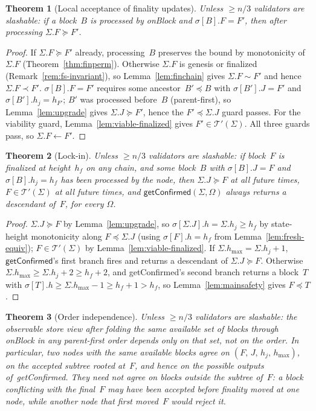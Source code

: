 \documentclass{article}
\newcommand{\hmax}{\ensuremath{h_{\max}}\xspace}
\newcommand{\viableTree}{\ensuremath{\mathcal{T}'}}
\newcommand{\onBlock}{\textsf{onBlock}\xspace}
\newcommand{\getConfirmed}{\textsf{getConfirmed}\xspace}
\theoremstyle{plain}
\newtheorem{theorem}{Theorem}
\theoremstyle{definition}
\theoremstyle{remark}
\begin{document}
\begin{theorem}[Local acceptance of finality updates]\label{thm:finlive}
Unless $\geq n/3$ validators are slashable: if a block~$B$ is processed by \onBlock and $\sigma[B].F = F'$, then after processing $\Sigma.F \succeq F'$.
\end{theorem}

\begin{proof}
If $\Sigma.F \succeq F'$ already, processing~$B$ preserves the bound by monotonicity of~$\Sigma.F$ (Theorem~\ref{thm:finperm}).
Otherwise $\Sigma.F$ is genesis or finalized (Remark~\ref{rem:fs-invariant}), so Lemma~\ref{lem:finchain} gives $\Sigma.F \sim F'$ and hence $\Sigma.F \prec F'$.
$\sigma[B].F = F'$ requires some ancestor~$B' \preceq B$ with $\sigma[B'].J = F'$ and $\sigma[B'].h_j = h_{F'}$; $B'$ was processed before~$B$ (parent-first), so Lemma~\ref{lem:upgrade} gives $\Sigma.J \succeq F'$, hence the $F' \preceq \Sigma.J$ guard passes.
For the viability guard, Lemma~\ref{lem:viable-finalized} gives $F' \in \viableTree(\Sigma)$.
All three guards pass, so $\Sigma.F \gets F'$.
\end{proof}

\begin{theorem}[Lock-in]\label{thm:lockin}
Unless $\geq n/3$ validators are slashable: if block~$F$ is finalized at height~$h_f$ on any chain, and some block~$B$ with $\sigma[B].J = F$ and $\sigma[B].h_j = h_f$ has been processed by the node, then $\Sigma.J \succeq F$ at all future times, $F \in \viableTree(\Sigma)$ at all future times, and $\getConfirmed(\Sigma, \Omega)$ always returns a descendant of~$F$, for every $\Omega$.
\end{theorem}

\begin{proof}
$\Sigma.J \succeq F$ by Lemma~\ref{lem:upgrade}, so $\sigma[\Sigma.J].h = \Sigma.h_j \geq h_f$ by state-height monotonicity along $F \preceq \Sigma.J$ (using $\sigma[F].h = h_f$ from Lemma~\ref{lem:fresh-equiv}); $F \in \viableTree(\Sigma)$ by Lemma~\ref{lem:viable-finalized}.
If $\Sigma.\hmax = \Sigma.h_j + 1$, $\getConfirmed$'s first branch fires and returns a descendant of $\Sigma.J \succeq F$.
Otherwise $\Sigma.\hmax \geq \Sigma.h_j + 2 \geq h_f + 2$, and \getConfirmed's second branch returns a block~$T$ with $\sigma[T].h \geq \Sigma.\hmax - 1 \geq h_f + 1 > h_f$, so Lemma~\ref{lem:mainsafety} gives $F \preceq T$.
\end{proof}

\begin{theorem}[Order independence]\label{thm:orderindep}
Unless $\geq n/3$ validators are slashable: the observable store view after folding the same available set of blocks through \onBlock in any parent-first order depends only on that set, not on the order.
In particular, two nodes with the same available blocks agree on $(F,\,J,\,h_j,\,\hmax)$, on the accepted subtree rooted at~$F$, and hence on the possible outputs of~\getConfirmed.
They need not agree on blocks outside the subtree of~$F$: a block conflicting with the final~$F$ may have been accepted before finality moved at one node, while another node that first moved~$F$ would reject it.
\end{theorem}
\end{document}

